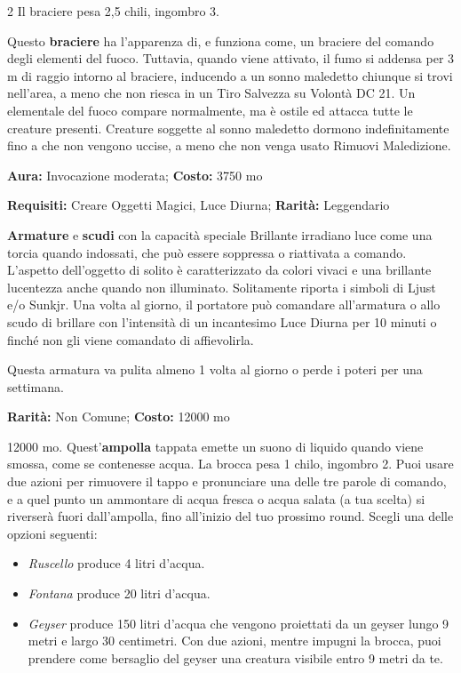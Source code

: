 \begin{multicols}{2}
Il braciere pesa 2,5 chili, ingombro 3.


Questo \textbf{braciere} ha l'apparenza di, e funziona come, un braciere del comando degli elementi del fuoco. Tuttavia, quando viene attivato, il fumo si addensa per 3 m di raggio intorno al braciere, inducendo a un sonno maledetto chiunque si trovi nell'area, a meno che non riesca in un Tiro Salvezza su Volontà DC 21. Un elementale del fuoco compare normalmente, ma è ostile ed attacca tutte le creature presenti. Creature soggette al sonno maledetto dormono indefinitamente fino a che non vengono uccise, a meno che non venga usato Rimuovi Maledizione.


\textbf{Aura:} Invocazione moderata; \textbf{Costo:} 3750 mo

\textbf{Requisiti:} Creare Oggetti Magici, Luce Diurna; \textbf{Rarità:} Leggendario

\textbf{Armature} e \textbf{scudi} con la capacità speciale Brillante irradiano luce come una torcia quando indossati, che può essere soppressa o riattivata a comando. L'aspetto dell'oggetto di solito è caratterizzato da colori vivaci e una brillante lucentezza anche quando non illuminato. Solitamente riporta i simboli di Ljust e/o Sunkjr. Una volta al giorno, il portatore può comandare all'armatura o allo scudo di brillare con l'intensità di un incantesimo Luce Diurna per 10 minuti o finché non gli viene comandato di affievolirla.

Questa armatura va pulita almeno 1 volta al giorno o perde i poteri per una settimana.


\textbf{Rarità:} Non Comune; \textbf{Costo:} 12000 mo

12000 mo. Quest'\textbf{ampolla} tappata emette un suono di liquido quando viene smossa, come se contenesse acqua. La brocca pesa 1 chilo, ingombro 2. Puoi usare due azioni per rimuovere il tappo e pronunciare una delle tre parole di comando, e a quel punto un ammontare di acqua fresca o acqua salata (a tua scelta) si riverserà fuori dall'ampolla, fino all'inizio del tuo prossimo round. Scegli una delle opzioni seguenti:

\begin{itemize}[leftmargin=*] \setlength{\itemsep}{0pt}
\item
\emph{Ruscello} produce 4 litri d'acqua.
\item
\emph{Fontana} produce 20 litri d'acqua.
\item
\emph{Geyser} produce 150 litri d'acqua che vengono proiettati da un geyser lungo 9 metri e largo 30 centimetri. Con due azioni, mentre impugni la brocca, puoi prendere come bersaglio del geyser una creatura visibile entro 9 metri da te.


\end{itemize}
\end{multicols}
